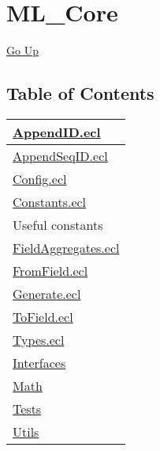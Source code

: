 \chapter*{\color{headtoc} ML\_Core}
\hypertarget{ecldoc:toc:root/ML_Core}{}
\hyperlink{ecldoc:toc:root}{Go Up}


\section*{Table of Contents}
{\renewcommand{\arraystretch}{1.5}
\begin{longtable}{|p{\textwidth}|}
\hline
\hyperlink{ecldoc:toc:ML_Core.AppendID}{AppendID.ecl} \\
\hline
\hyperlink{ecldoc:toc:ML_Core.AppendSeqID}{AppendSeqID.ecl} \\
\hline
\hyperlink{ecldoc:toc:ML_Core.Config}{Config.ecl} \\
\hline
\hyperlink{ecldoc:toc:ML_Core.Constants}{Constants.ecl} \\
Useful constants \\
\hline
\hyperlink{ecldoc:toc:ML_Core.FieldAggregates}{FieldAggregates.ecl} \\
\hline
\hyperlink{ecldoc:toc:ML_Core.FromField}{FromField.ecl} \\
\hline
\hyperlink{ecldoc:toc:ML_Core.Generate}{Generate.ecl} \\
\hline
\hyperlink{ecldoc:toc:ML_Core.ToField}{ToField.ecl} \\
\hline
\hyperlink{ecldoc:toc:ML_Core.Types}{Types.ecl} \\
\hline
\hyperlink{ecldoc:toc:root/ML_Core/Interfaces}{Interfaces} \\
\hline
\hyperlink{ecldoc:toc:root/ML_Core/Math}{Math} \\
\hline
\hyperlink{ecldoc:toc:root/ML_Core/Tests}{Tests} \\
\hline
\hyperlink{ecldoc:toc:root/ML_Core/Utils}{Utils} \\
\hline
\end{longtable}
}














